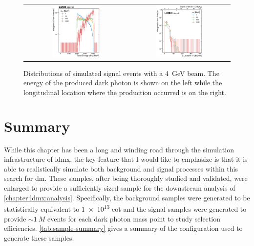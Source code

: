 \begin{figure}
  \centering
  \begin{tabular}{cc}
    \includegraphics[width=0.48\textwidth]{figures/ldmx/simulation/ap_energy.pdf} &
    \includegraphics[width=0.48\textwidth]{figures/ldmx/simulation/db_z.pdf}
  \end{tabular}
  \caption{Distributions of simulated signal events with a \qty{4}{\giga\electronvolt} beam.
  The energy of the produced dark photon is shown on the left while the longitudinal
  location where the production occurred is on the right.}
  \label{fig:db-character-energy-and-z}
\end{figure}

\section{Summary}
While this chapter has been a long and winding road through the simulation infrastructure
of \ac{ldmx}, the key feature that I would like to emphasize is that it is able to
realistically simulate both background and signal processes within this search for \ac{dm}.
These samples, after being thoroughly studied and validated, were enlarged to provide
a sufficiently sized sample for the downstream analysis of \cref{chapter:ldmx:analysis}.
Specifically, the background samples were generated to be statistically equivalent to
\num{1e13} \ac{eot} and the signal samples were generated to provide $\sim \qty{1}{M}$
events for each dark photon mass point to study selection efficiencies.
\cref{tab:sample-summary} gives a summary of the configuration used to generate these
samples.

